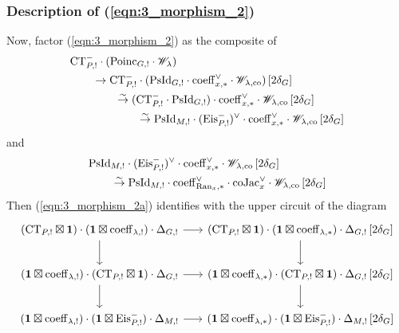\subsubsection{Description of (\ref{eqn:3_morphism_2})} Now, factor (\ref{eqn:3_morphism_2}) as the composite of
\begin{equation}
\label{eqn:3_morphism_2a}
\begin{split}
    & \mathrm{CT}_{P,!}^- \cdot ( \mathrm{Poinc}_{G,!} \cdot \mathscr{W}_\lambda ) \\
    & \qquad \to \mathrm{CT}_{P,!}^- \cdot ( \mathrm{PsId}_{G,!} \cdot \mathrm{coeff}_{x,*}^\vee \cdot \mathscr{W}_{\lambda, \mathrm{co}} ) \, [2\delta_G] \\
    & \qquad\qquad \overset{\sim}{\rightarrow} (\mathrm{CT}_{P,!}^- \cdot \mathrm{PsId}_{G,!}) \cdot \mathrm{coeff}_{x,*}^\vee \cdot \mathscr{W}_{\lambda, \mathrm{co}} \, [2\delta_G] \\
    & \qquad\qquad\qquad \overset{\sim}{\rightarrow} \mathrm{PsId}_{M,!} \cdot (\mathrm{Eis}_{P,!}^-)^\vee \cdot \mathrm{coeff}_{x,*}^\vee \cdot \mathscr{W}_{\lambda, \mathrm{co}} \, [2\delta_G]
\end{split}
\end{equation}
and
\begin{equation}
\label{eqn:3_morphism_2b}
\begin{split}
    & \mathrm{PsId}_{M,!} \cdot (\mathrm{Eis}_{P,!}^-)^\vee \cdot \mathrm{coeff}_{x,*}^\vee \cdot \mathscr{W}_{\lambda, \mathrm{co}} \, [2\delta_G] \\
    & \qquad \overset{\sim}{\rightarrow} \mathrm{PsId}_{M,!} \cdot \mathrm{coeff}_{\mathrm{Ran}_x, *}^\vee \cdot \mathrm{co}\mathrm{Jac}_x^\vee \cdot \mathscr{W}_{\lambda, \mathrm{co}} \, [2\delta_G]
\end{split}
\end{equation}
Then (\ref{eqn:3_morphism_2a}) identifies with the upper circuit of the diagram
\[
\begin{tikzcd}[
  column sep={18em,between origins},
  row sep={4em,between origins}
]
    (\CT_{P,!} \boxtimes \id) \cdot (\id \boxtimes \coeff_{\lambda,!}) \cdot \Delta_{G,!} 
    \arrow[r] \arrow[d] & (\CT_{P,!} \boxtimes \id) \cdot (\id \boxtimes \coeff_{\lambda, *}) \cdot \Delta_{G,!} \, [2 \delta_G] \arrow[d] \\
    (\id \boxtimes \coeff_{\lambda,!}) \cdot (\CT_{P,!} \boxtimes \id) \cdot \Delta_{G,!} 
    \arrow[r] \arrow[d] & (\id \boxtimes \coeff_{\lambda, *}) \cdot (\CT_{P,!} \boxtimes \id) \cdot \Delta_{G,!} \, [2 \delta_G] \arrow[d] \\
    (\id \boxtimes \coeff_{\lambda,!}) \cdot (\id \boxtimes \Eis_{P,!}^-) \cdot \Delta_{M,!}
    \arrow[r] & (\id \boxtimes \coeff_{\lambda, *}) \cdot (\id \boxtimes \Eis_{P,!}^-) \cdot \Delta_{M,!} \, [2 \delta_G]
\end{tikzcd}
\]
